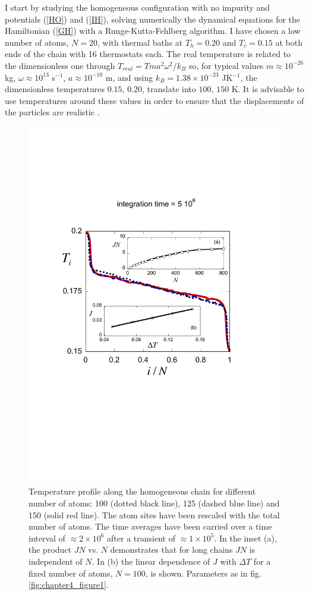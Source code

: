 I start by studying the homogeneous configuration with no impurity and potentials (\ref{HO}) and (\ref{IH}), solving numerically the dynamical equations for  the Hamiltonian (\ref{GH}) with a Runge-Kutta-Fehlberg algorithm. I have chosen a low number of atoms, $N=20$,  with thermal baths at $T_h=0.20$ and $T_c=0.15$ at both ends of the chain with 16 thermostats each. The real temperature is related to the dimensionless one through $T_{real}=T m a^2 \omega^2/k_B$ so, for typical values  $m\approx10^{-26}$ kg, $\omega \approx 10^{13}$ s$^{-1}$, $a\approx 10^{-10}$ m, and using $k_B =1.38 \times 10^{-23}$ JK$^{-1}$,
the dimensionless temperatures $0.15,\, 0.20$, translate into $100,\, 150$ K. It is advisable to use temperatures around these values in order to ensure that the displacements of the particles are realistic \cite{Casati1984}.

\begin{figure}
\centering
\includegraphics[width=0.65\linewidth]{Figures/FIG3.pdf}
\caption{Temperature profile along the homogeneous chain for different number of atoms: 100 (dotted black line), 125 (dashed blue line) and 150 (solid red line). The atom sites have been rescaled with the total number of atoms.
The time averages have been carried over a time interval of $\approx 2 \times 10^6$ after a transient of $\approx 1\times 10^5$. In the inset (a), the product $JN$ vs. $N$ demonstrates that for long chains $JN$ is independent of $N$. In (b) the linear dependence of $J$ with $\Delta T$ for a fixed number of atoms, $N=100$, is shown. Parameters as in fig. \ref{fig:chapter4_figure1}.}
\label{fig:chapter4_figure3}
\end{figure}

